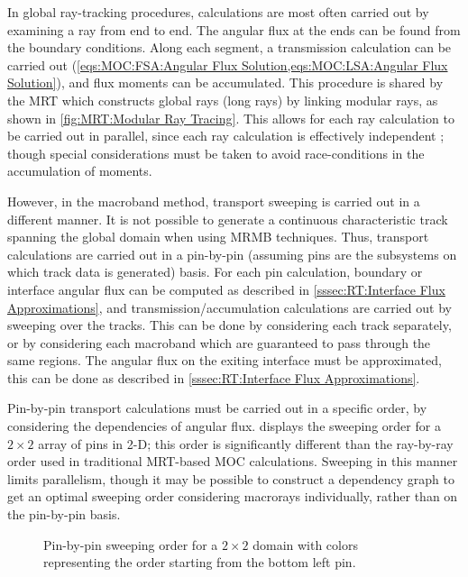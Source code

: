 {{{      In global ray-tracking procedures, calculations are most often carried out by examining a ray from end to end.
      The angular flux at the ends can be found from the boundary conditions.
      Along each segment, a transmission calculation can be carried out (\cref{eqs:MOC:FSA:Angular Flux Solution,eqs:MOC:LSA:Angular Flux Solution}), and flux moments can be accumulated.
      This procedure is shared by the \ac{MRT} which constructs global rays (long rays) by linking modular rays, as shown in \cref{fig:MRT:Modular Ray Tracing}.
      This allows for each ray calculation to be carried out in parallel, since each ray calculation is effectively independent \cite{Kochunas2013}; though special considerations must be taken to avoid race-conditions in the accumulation of moments.

      However, in the macroband method, transport sweeping is carried out in a different manner.
      It is not possible to generate a continuous characteristic track spanning the global domain when using \ac{MRMB} techniques.
      Thus, transport calculations are carried out in a pin-by-pin (assuming pins are the subsystems on which track data is generated) basis.
      For each pin calculation, boundary or interface angular flux can be computed as described in \cref{sssec:RT:Interface Flux Approximations}, and transmission/accumulation calculations are carried out by sweeping over the tracks.
      This can be done by considering each track separately, or by considering each macroband which are guaranteed to pass through the same regions.
      The angular flux on the exiting interface must be approximated, this can be done as described in \cref{sssec:RT:Interface Flux Approximations}.

      Pin-by-pin transport calculations must be carried out in a specific order, by considering the dependencies of angular flux.
       displays the sweeping order for a $2\times2$ array of pins in 2-D; this order is significantly different than the ray-by-ray order used in traditional \ac{MRT}-based \ac{MOC} calculations.
      Sweeping in this manner limits parallelism, though it may be possible to construct a dependency graph to get an optimal sweeping order considering macrorays individually, rather than on the pin-by-pin basis.

      \begin{figure}[h]
        \centering
        \def\svgwidth{0.45\linewidth}
        
        \caption{Pin-by-pin sweeping order for a $2\times2$ domain with colors representing the order starting from the bottom left pin.}
        \label{fig:RT:Macroband Sweep Order}
      \end{figure}
    }
  }
  \printbibliography
}
